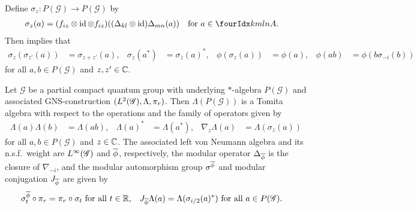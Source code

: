 Define $\sigma_{z} \colon P(\mathscr{G}) \to P(\mathscr{G})$
by
\begin{align*}
\sigma_{z}(a) &= (f_{iz} \otimes \id \otimes f_{iz})((\Delta_{kl}
\otimes \id)\Delta_{mn}(a)) \quad \text{for } a\in \Gr{A}{k}{l}{m}{n}.
\end{align*}
Then \cite[Theorem 2.25]{DCT1} implies that
\begin{align} \label{eq:alg-mod-aut}
 \sigma_{z}(\sigma_{z'}(a)) &= \sigma_{z+z'}(a), &
 \sigma_{z}(a^{*}) &= \sigma_{\overline{z}}(a)^{*}, &
\phi(\sigma_{z}(a)) &= \phi(a), & \phi(ab) &= \phi(b\sigma_{-i}(b))
\end{align}
for all $a,b\in P(\mathscr{G})$ and $z,z'\in \mathbb{C}$. 
\begin{Prop} \label{prop:tomita}
  Let $\mathscr{G}$ be a partial compact quantum group with underlying
  $*$-algebra $P(\mathscr{G})$ and associated GNS-construction
  $(L^{2}(\mathscr{G}),\Lambda,\pi_{r})$. Then 
  $\Lambda(P(\mathscr{G}))$ is a Tomita algebra with
  respect to the operations and the family of operators given by
  \begin{align*}
    \Lambda(a)\Lambda(b)&=\Lambda(ab), & \Lambda(a)^{*}&=
  \Lambda(a^{*}), &
\nabla_{z}\Lambda(a)&=\Lambda(\sigma_{z}(a))
  \end{align*}
  for all $a,b\in P(\mathscr{G})$ and $z\in \mathbb{C}$.  The associated left
  von Neumann algebra and its n.s.f.\ weight are $L^{\infty}(\mathscr{G})$ and
  $\overline{\phi}$, respectively, the modular operator $\Delta_{\overline{\phi}}$ is
  the closure of $\nabla_{-i}$, and the   modular automorphism group $\sigma^{\overline{\phi}}$
  and modular conjugation $J_{\overline{\phi}}$ are given by
  \begin{align*}
    \sigma^{\overline{\phi}}_{t} \circ \pi_{r} &= \pi_{r} \circ \sigma_{t}
    \text{ for all } t\in \mathbb{R}, & J_{\overline{\phi}}
    \Lambda(a)&=\Lambda(\sigma_{i/2}(a)^{*}) \text{ for all } a\in
    P(\mathscr{G}).
  \end{align*}
\end{Prop}
